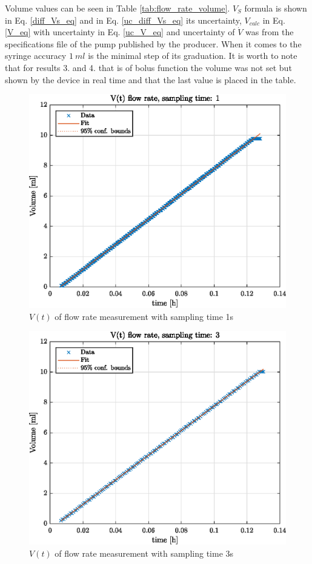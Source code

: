 \documentclass[12pt,a4paper]{article}
\begin{document}
	Volume values can be seen in Table \ref{tab:flow_rate_volume}. $V_S$ formula is shown in Eq. \ref{diff_Vs_eq} and in Eq. \ref{uc_diff_Vs_eq} its uncertainty, $V_{calc}$ in Eq. \ref{V_eq} with uncertainty in Eq. \ref{uc_V_eq} and uncertainty of $\dot{V}$ was from the specifications file of the pump published by the producer. When it comes to the syringe accuracy $1~ml$ is the minimal step of its graduation. It is worth to note that for results 3. and 4. that is of bolus function the volume was not set but shown by the device in real time and that the last value is placed in the table.
	\newpage
	\begin{figure}[h!]
		\centering
		\includegraphics[width=0.8\linewidth]{figures/V_t__flow_rate__sampling_time__1.eps}
		\caption{$V(t)$ of flow rate measurement with sampling time 1s}
		\label{fig:v_t_fr1}
	\end{figure}
	
	\begin{figure}[h!]
		\centering
		\includegraphics[width=0.8\linewidth]{figures/V_t__flow_rate__sampling_time__3.eps}
		\caption{$V(t)$ of flow rate measurement with sampling time 3s}
		\label{fig:v_t_fr3}
	\end{figure}
	
\end{document}
